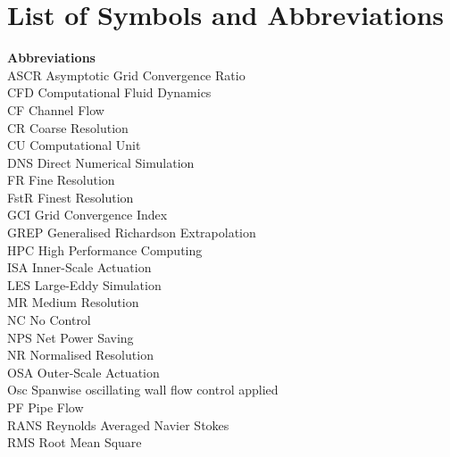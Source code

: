 
\section*{List of Symbols and Abbreviations}
\begin{tabbing}
	\textbf{Abbreviations} \= \\
	ASCR \> Asymptotic Grid Convergence Ratio \\
	CFD \> Computational Fluid Dynamics\\
	CF \> Channel Flow \\
	CR \> Coarse Resolution \\
	CU \> Computational Unit \\
	DNS \> Direct Numerical Simulation \\
	FR \> Fine Resolution \\
	FstR \> Finest Resolution \\
	GCI \> Grid Convergence Index \\
	GREP \> Generalised Richardson Extrapolation \\
	HPC \> High Performance Computing \\
	ISA \> Inner-Scale Actuation \\
	LES \> Large-Eddy Simulation\\
	MR \> Medium Resolution \\
	NC \> No Control \\
	NPS \> Net Power Saving \\
	NR \> Normalised Resolution \\
	OSA \> Outer-Scale Actuation\\
	Osc \> Spanwise oscillating wall flow control applied\\
	PF \> Pipe Flow \\
	RANS \> Reynolds Averaged Navier Stokes\\
	RMS \> Root Mean Square\\
	\\
	

\end{tabbing}
